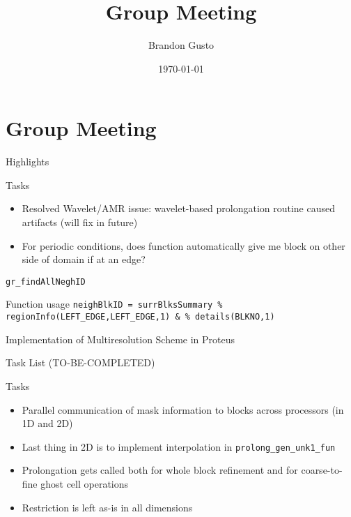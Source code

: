 \documentclass{beamer}
\begin{document}
  \section{Group Meeting}
  \title{Group Meeting}
  \author{Brandon Gusto}

  \date{\today}
  \frame{\titlepage}

  \begin{frame}{Highlights}
    \begin{block}{Tasks}
      \begin{itemize}
        \setlength\itemsep{1em}
        \item Resolved Wavelet/AMR issue: wavelet-based prolongation routine
            caused artifacts (will fix in future)
        \item For periodic conditions, does function automatically give me block on other side of domain if at an edge?
      \end{itemize}
    \end{block}
  \end{frame}

  \begin{frame}{\texttt{gr\_findAllNeghID}}
    \begin{block}{Function usage}
      \texttt{neighBlkID = surrBlksSummary \% regionInfo(LEFT\_EDGE,LEFT\_EDGE,1) \& \% details(BLKNO,1)}
    \end{block}
  \end{frame}

  \begin{frame}{Implementation of Multiresolution Scheme in Proteus}
    \begin{figure}
      
    \end{figure}
  \end{frame}

  \begin{frame}{Task List (TO-BE-COMPLETED)}
    \begin{block}{Tasks}
      \begin{itemize}
        \setlength\itemsep{1em}
        \item Parallel communication of mask information to blocks across processors (in 1D and 2D)
        \item Last thing in 2D is to implement interpolation in \texttt{prolong\_gen\_unk1\_fun}
        \item Prolongation gets called both for whole block refinement and for coarse-to-fine ghost cell operations
        \item Restriction is left as-is in all dimensions
      \end{itemize}
    \end{block}
  \end{frame}
\end{document}
